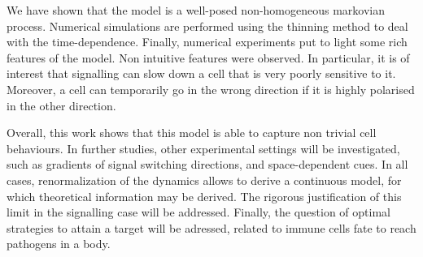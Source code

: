 \documentclass[a4paper,11pt]{article}
\begin{document}
We have shown that the model is a well-posed non-homogeneous markovian process. Numerical simulations are performed using the thinning method to deal with the time-dependence. Finally, numerical experiments put to light some rich features of the model. Non intuitive features were observed. In particular, it is of interest that signalling can slow down a cell that is very poorly sensitive to it. Moreover, a cell can temporarily go in the wrong direction if it is highly polarised in the other direction.

Overall, this work shows that this model is able to capture non trivial cell behaviours. In further studies, other experimental settings will be investigated, such as gradients of signal switching directions, and space-dependent cues. In all cases, renormalization of the dynamics allows to derive a continuous model, for which theoretical information may be derived. The rigorous justification of this limit in the signalling case will be addressed. Finally, the question of optimal strategies to attain a target will be adressed, related to immune cells fate to reach pathogens in a body. 

	
\newpage


\end{document}

